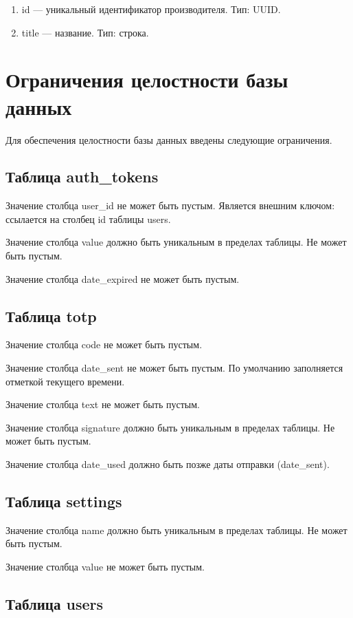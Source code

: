 \begin{enumerate}
	\item id --- уникальный идентификатор производителя. Тип: UUID.
	\item title --- название. Тип: строка.
\end{enumerate}

\section{Ограничения целостности базы данных}

Для обеспечения целостности базы данных введены следующие ограничения.

\subsection{Таблица auth\_tokens}

Значение столбца user\_id не может быть пустым. Является внешним ключом: ссылается на столбец id таблицы users.

Значение столбца value должно быть уникальным в пределах таблицы. Не может быть пустым.

Значение столбца date\_expired не может быть пустым.

\subsection{Таблица totp}

Значение столбца code не может быть пустым.

Значение столбца date\_sent не может быть пустым. По умолчанию заполняется отметкой текущего времени.

Значение столбца text не может быть пустым.

Значение столбца signature должно быть уникальным в пределах таблицы. Не может быть пустым.

Значение столбца date\_used должно быть позже даты отправки (date\_sent).

\subsection{Таблица settings}

Значение столбца name должно быть уникальным в пределах таблицы. Не может быть пустым.

Значение столбца value не может быть пустым.

\subsection{Таблица users}

